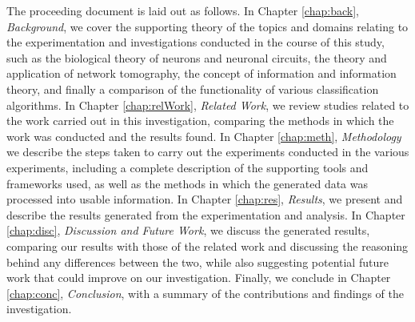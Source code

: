 The proceeding document is laid out as follows. In Chapter \ref{chap:back}, \emph{Background}, we cover the supporting theory of the topics and domains relating to the experimentation and investigations conducted in the course of this study, such as the biological theory of neurons and neuronal circuits, the theory and application of network tomography, the concept of information and information theory, and finally a comparison of the functionality of various classification algorithms. In Chapter \ref{chap:relWork}, \emph{Related Work}, we review studies related to the work carried out in this investigation, comparing the methods in which the work was conducted and the results found. In Chapter \ref{chap:meth}, \emph{Methodology} we describe the steps taken to carry out the experiments conducted in the various experiments, including a complete description of the supporting tools and frameworks used, as well as the methods in which the generated data was processed into usable information. In Chapter \ref{chap:res}, \emph{Results}, we present and describe the results generated from the experimentation and analysis. In Chapter \ref{chap:disc}, \emph{Discussion and Future Work}, we discuss the generated results, comparing our results with those of the related work and discussing the reasoning behind any differences between the two, while also suggesting potential future work that could improve on our investigation. Finally, we conclude in Chapter \ref{chap:conc}, \emph{Conclusion}, with a summary of the contributions and findings of the investigation.

